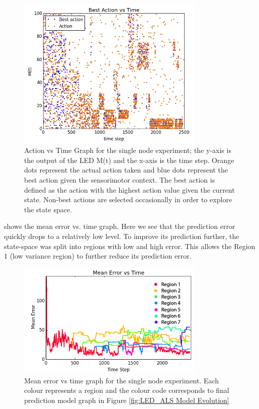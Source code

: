\begin{figure} [!htb]
	\centering
	\includegraphics[width=0.8\textwidth]{"fig/validations/LED_ALS Action Selection"}
	\caption[Action vs Time Graph for the single node experiment]{Action vs Time Graph for the single node experiment; the y-axis is the output of the LED M(t) and the x-axis is the time step. Orange dots represent the actual action taken and blue dots represent the best action given the sensorimotor context. The best action is defined as the action with the highest action value given the current state. Non-best actions are selected occasionally in order to explore the state space.}
	\label{fig:LED_ALS Action Selection}
\end{figure}

 shows the mean error vs. time graph. Here we see that the prediction error quickly drops to a relatively low level. To improve its prediction further, the state-space was split into regions with low and high error. This allows the Region 1 (low variance region) to further reduce its prediction error.

\begin{figure}  [!htb]
	\centering
	\includegraphics[width=0.8\textwidth]{"fig/validations/LED_ALS Mean Error vs Time"}
	\caption[Mean error vs time graph for the single node experiment]{Mean error vs time graph for the single node experiment. Each colour represents a region and the colour code corresponds to final prediction model graph in Figure \ref{fig:LED_ALS Model Evolution} }
	\label{fig:LED_ALS Mean Error vs Time}
\end{figure}


